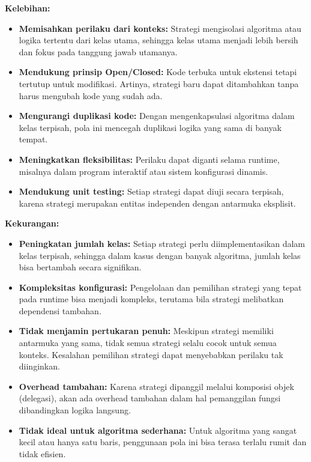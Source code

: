 \textbf{Kelebihan:}
\begin{itemize}
	\item \textbf{Memisahkan perilaku dari konteks:} Strategi mengisolasi algoritma atau logika tertentu dari kelas utama, sehingga kelas utama menjadi lebih bersih dan fokus pada tanggung jawab utamanya.
	
	\item \textbf{Mendukung prinsip Open/Closed:} Kode terbuka untuk ekstensi tetapi tertutup untuk modifikasi. Artinya, strategi baru dapat ditambahkan tanpa harus mengubah kode yang sudah ada.
	
	\item \textbf{Mengurangi duplikasi kode:} Dengan mengenkapsulasi algoritma dalam kelas terpisah, pola ini mencegah duplikasi logika yang sama di banyak tempat.
	
	\item \textbf{Meningkatkan fleksibilitas:} Perilaku dapat diganti selama runtime, misalnya dalam program interaktif atau sistem konfigurasi dinamis.
	
	\item \textbf{Mendukung unit testing:} Setiap strategi dapat diuji secara terpisah, karena strategi merupakan entitas independen dengan antarmuka eksplisit.
\end{itemize}

\textbf{Kekurangan:}
\begin{itemize}
	\item \textbf{Peningkatan jumlah kelas:} Setiap strategi perlu diimplementasikan dalam kelas terpisah, sehingga dalam kasus dengan banyak algoritma, jumlah kelas bisa bertambah secara signifikan.
	
	\item \textbf{Kompleksitas konfigurasi:} Pengelolaan dan pemilihan strategi yang tepat pada runtime bisa menjadi kompleks, terutama bila strategi melibatkan dependensi tambahan.
	
	\item \textbf{Tidak menjamin pertukaran penuh:} Meskipun strategi memiliki antarmuka yang sama, tidak semua strategi selalu cocok untuk semua konteks. Kesalahan pemilihan strategi dapat menyebabkan perilaku tak diinginkan.
	
	\item \textbf{Overhead tambahan:} Karena strategi dipanggil melalui komposisi objek (delegasi), akan ada overhead tambahan dalam hal pemanggilan fungsi dibandingkan logika langsung.
	
	\item \textbf{Tidak ideal untuk algoritma sederhana:} Untuk algoritma yang sangat kecil atau hanya satu baris, penggunaan pola ini bisa terasa terlalu rumit dan tidak efisien.
\end{itemize}

